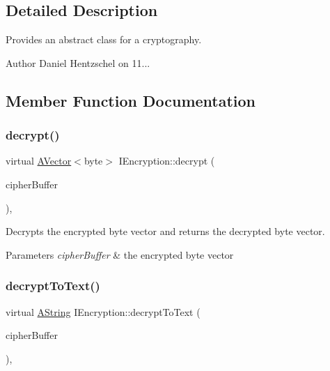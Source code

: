 \subsection{Detailed Description}
Provides an abstract class for a cryptography. 

\begin{DoxyAuthor}{Author}
Daniel Hentzschel on 11... 
\end{DoxyAuthor}


\subsection{Member Function Documentation}
\mbox{\label{class_i_encryption_a07250dc1d1f1cd6de54df34e079f749d}} 
\subsubsection{\texorpdfstring{decrypt()}{decrypt()}}
{\footnotesize\ttfamily virtual \mbox{\hyperlink{class_a_vector}{A\+Vector}}$<$byte$>$ I\+Encryption\+::decrypt (\begin{DoxyParamCaption}\item[{const \mbox{\hyperlink{class_a_vector}{A\+Vector}}$<$ byte $>$ \&}]{cipher\+Buffer }\end{DoxyParamCaption})\hspace{0.3cm}{\ttfamily [protected]}, {}}



Decrypts the encrypted byte vector and returns the decrypted byte vector. 


\begin{DoxyParams}{Parameters}
{\em cipher\+Buffer} & the encrypted byte vector \\
\hline
\end{DoxyParams}
\mbox{\label{class_i_encryption_ad1dafdacb077abfd40a995ae22ef0396}} 
\subsubsection{\texorpdfstring{decryptToText()}{decryptToText()}}
{\footnotesize\ttfamily virtual \mbox{\hyperlink{class_a_string}{A\+String}} I\+Encryption\+::decrypt\+To\+Text (\begin{DoxyParamCaption}\item[{const \mbox{\hyperlink{class_a_vector}{A\+Vector}}$<$ byte $>$ \&}]{cipher\+Buffer }\end{DoxyParamCaption})\hspace{0.3cm}{\ttfamily [protected]}, {}}



